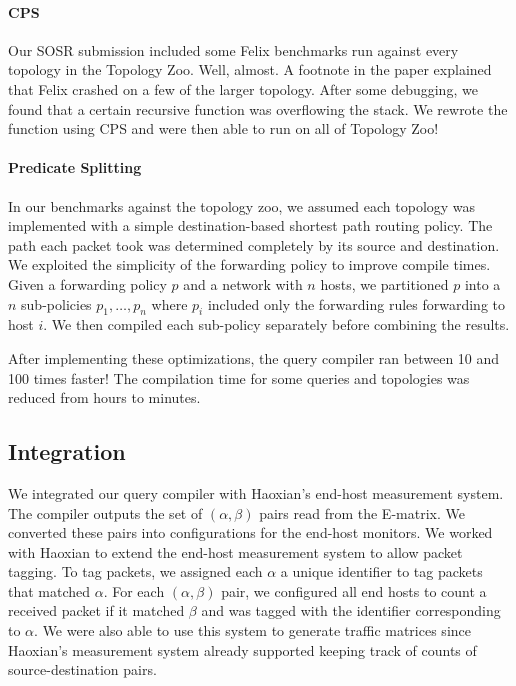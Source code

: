\documentclass{hw}
\begin{document}
\paragraph{CPS}
Our SOSR submission included some Felix benchmarks run against every topology
in the Topology Zoo. Well, almost. A footnote in the paper explained that Felix
crashed on a few of the larger topology. After some debugging, we found that a
certain recursive function was overflowing the stack. We rewrote the function
using CPS and were then able to run on all of Topology Zoo!

\paragraph{Predicate Splitting}
In our benchmarks against the topology zoo, we assumed each topology was
implemented with a simple destination-based shortest path routing policy. The
path each packet took was determined completely by its source and destination.
We exploited the simplicity of the forwarding policy to improve compile times.
Given a forwarding policy $p$ and a network with $n$ hosts, we partitioned $p$
into a $n$ sub-policies $p_1, \ldots, p_n$ where $p_i$ included only the
forwarding rules forwarding to host $i$. We then compiled each sub-policy
separately before combining the results.

After implementing these optimizations, the query compiler ran between 10 and
100 times faster! The compilation time for some queries and topologies was
reduced from hours to minutes.

\subsection{Integration}
We integrated our query compiler with Haoxian's end-host measurement system.
The compiler outputs the set of $(\alpha, \beta)$ pairs read from the E-matrix.
We converted these pairs into configurations for the end-host monitors. We
worked with Haoxian to extend the end-host measurement system to allow packet
tagging. To tag packets, we assigned each $\alpha$ a unique identifier to tag
packets that matched $\alpha$. For each $(\alpha, \beta)$ pair, we configured
all end hosts to count a received packet if it matched $\beta$ and was tagged
with the identifier corresponding to $\alpha$.  We were also able to use this
system to generate traffic matrices since Haoxian's measurement system already
supported keeping track of counts of source-destination pairs.
\end{document}
